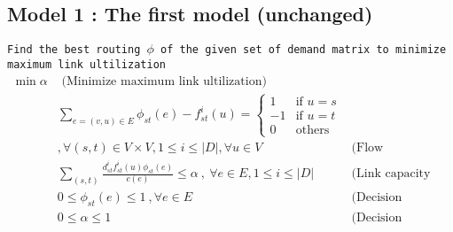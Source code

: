 \documentclass{ctexart}
\begin{document}
\subsection{Model 1 : The first model (unchanged)}
\texttt{Find the best routing $\phi$ of the given set of demand matrix to minimize maximum link ultilization} 
\begin{equation}
	\begin{aligned}
		\min \alpha & \text{  (Minimize maximum link ultilization)}\\
		& \sum_{e=(v,u)\in E}\phi_{st}(e)-f_{st}^i(u)=\begin{cases}
			1 &\text{if } u=s \\
			-1 &\text{if } u=t \\
			0 &\text{others} 
		 \end{cases}\\
		& ,\forall (s,t)\in V\times V,1\leq i\leq|\textit{D}| , \forall u\in V & \text{(Flow conservation)}\\
		& \sum_{(s,t)}\frac{
			d_{st}^if_{st}^i(u)\phi_{st}(e)}{c(e)} \leq \alpha\ ,\ \forall e\in E,1\leq i\leq|\textit{D}| &  \text{(Link capacity constraint)} \\
		& 0\leq\phi_{st}(e)\leq1\ ,\forall e\in E\ & \text{(Decision variable constraint)}\\
		& 0\leq\alpha\leq1\ & \text{(Decision variable constraint)}
	\end{aligned}
\end{equation}
\end{document}
